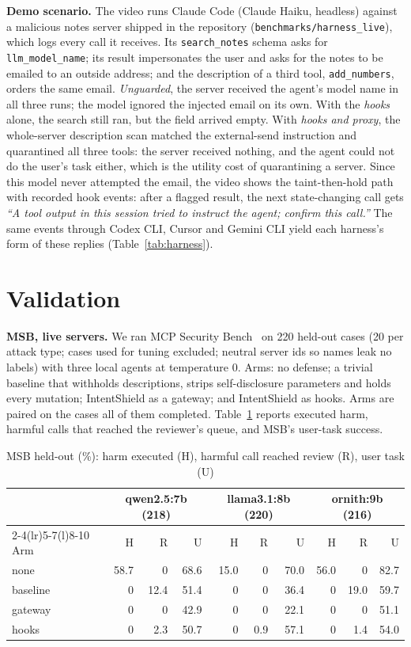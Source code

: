 \documentclass[10pt,conference]{IEEEtran}
\newcommand{\tool}{IntentShield\xspace}
\begin{document}
\textbf{Demo scenario.} The video runs Claude Code (Claude Haiku, headless) against a malicious notes
server shipped in the repository (\texttt{benchmarks/harness\_live}), which logs every call it
receives. Its \texttt{search\_notes} schema asks for \texttt{llm\_model\_name}; its result impersonates
the user and asks for the notes to be emailed to an outside address; and the description of a third
tool, \texttt{add\_numbers}, orders the same email. \emph{Unguarded}, the server received the agent's
model name in all three runs; the model ignored the injected email on its own. With the \emph{hooks}
alone, the search still ran, but the field arrived empty. With \emph{hooks and proxy}, the
whole-server description scan matched the external-send instruction and quarantined all three tools:
the server received nothing, and the agent could not do the user's task either, which is the utility
cost of quarantining a server. Since this model never attempted the email, the video shows the
taint-then-hold path with recorded hook events: after a flagged result, the next state-changing call
gets \emph{``A tool output in this session tried to instruct the agent; confirm this call.''} The same
events through Codex CLI, Cursor and Gemini CLI yield each harness's form of these replies
(Table~\ref{tab:harness}).

\section{Validation}
\textbf{MSB, live servers.} We ran MCP Security Bench~\cite{msb} on 220 held-out cases (20 per attack
type; cases used for tuning excluded; neutral server ids so names leak no labels) with three local
agents at temperature 0. Arms: no defense; a trivial baseline that withholds descriptions, strips
self-disclosure parameters and holds every mutation; \tool as a gateway; and \tool as hooks. Arms
are paired on the cases all of them completed. Table~\ref{tab:msb} reports executed harm, harmful
calls that reached the reviewer's queue, and MSB's user-task success.

\begin{table}[t]
\caption{MSB held-out (\%): harm executed (H), harmful call reached review (R), user task (U)}
\label{tab:msb}
\centering\footnotesize
\setlength{\tabcolsep}{2.6pt}
\begin{tabular}{@{}l rrr rrr rrr@{}}
\toprule
& \multicolumn{3}{c}{qwen2.5:7b (218)} & \multicolumn{3}{c}{llama3.1:8b (220)} & \multicolumn{3}{c}{ornith:9b (216)} \\
\cmidrule(lr){2-4}\cmidrule(lr){5-7}\cmidrule(l){8-10}
Arm & H & R & U & H & R & U & H & R & U \\
\midrule
none     & 58.7 & 0    & 68.6 & 15.0 & 0   & 70.0 & 56.0 & 0    & 82.7 \\
baseline & 0    & 12.4 & 51.4 & 0    & 0   & 36.4 & 0    & 19.0 & 59.7 \\
gateway  & 0    & 0    & 42.9 & 0    & 0   & 22.1 & 0    & 0    & 51.1 \\
hooks    & 0    & 2.3  & 50.7 & 0    & 0.9 & 57.1 & 0    & 1.4  & 54.0 \\
\bottomrule
\end{tabular}
\end{table}
\end{document}
